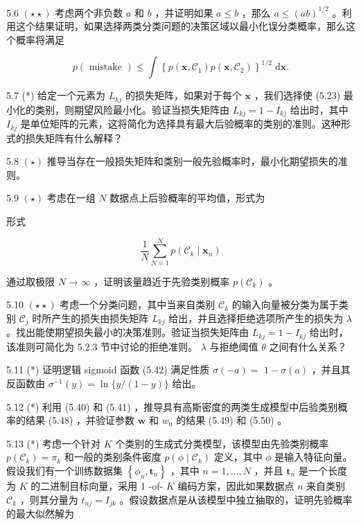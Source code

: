 \documentclass[10pt]{report}
\begin{document}
5.6 \(\left( {\star  \star  }\right)\) 考虑两个非负数 \(a\) 和 \(b\) ，并证明如果 \(a \leq  b\) ，那么 \(a \leq  {\left( ab\right) }^{1/2}\) 。利用这个结果证明，如果选择两类分类问题的决策区域以最小化误分类概率，那么这个概率将满足

\[
p\left( \text{ mistake }\right)  \leq  \int {\left\{  p\left( \mathbf{x},{\mathcal{C}}_{1}\right) p\left( \mathbf{x},{\mathcal{C}}_{2}\right) \right\}  }^{1/2}\mathrm{\;d}\mathbf{x}. \tag{5.99}
\]

5.7 (*) 给定一个元素为 \({L}_{kj}\) 的损失矩阵，如果对于每个 \(\mathbf{x}\) ，我们选择使 (5.23) 最小化的类别，则期望风险最小化。验证当损失矩阵由 \({L}_{kj} = 1 - {I}_{kj}\) 给出时，其中 \({I}_{kj}\) 是单位矩阵的元素，这将简化为选择具有最大后验概率的类别的准则。这种形式的损失矩阵有什么解释？

5.8 \(\left( \star \right)\) 推导当存在一般损失矩阵和类别一般先验概率时，最小化期望损失的准则。

5.9 \(\left( \star \right)\) 考虑在一组 \(N\) 数据点上后验概率的平均值，形式为

形式

\[
\frac{1}{N}\mathop{\sum }\limits_{{N = 1}}^{N}p\left( {{\mathcal{C}}_{k} \mid  {\mathbf{x}}_{n}}\right)  \tag{5.100}
\]

通过取极限 \(N \rightarrow  \infty\) ，证明该量趋近于先验类别概率 \(p\left( {\mathcal{C}}_{k}\right)\) 。

5.10 \(\left( {\star  \star  }\right)\) 考虑一个分类问题，其中当来自类别 \({\mathcal{C}}_{k}\) 的输入向量被分类为属于类别 \({\mathcal{C}}_{j}\) 时所产生的损失由损失矩阵 \({L}_{kj}\) 给出，并且选择拒绝选项所产生的损失为 \(\lambda\) 。找出能使期望损失最小的决策准则。验证当损失矩阵由 \({L}_{kj} = 1 - {I}_{kj}\) 给出时，该准则可简化为 5.2.3 节中讨论的拒绝准则。 \(\lambda\) 与拒绝阈值 \(\theta\) 之间有什么关系？

5.11 (*) 证明逻辑 sigmoid 函数 (5.42) 满足性质 \(\sigma \left( {-a}\right)  =\)  \(1 - \sigma \left( a\right)\) ，并且其反函数由 \({\sigma }^{-1}\left( y\right)  = \ln \{ y/\left( {1 - y}\right) \}\) 给出。

5.12 (*) 利用 (5.40) 和 (5.41) ，推导具有高斯密度的两类生成模型中后验类别概率的结果 (5.48) ，并验证参数 \(\mathbf{w}\) 和 \({w}_{0}\) 的结果 (5.49) 和 (5.50) 。

5.13 (*) 考虑一个针对 \(K\) 个类别的生成式分类模型，该模型由先验类别概率 \(p\left( {\mathcal{C}}_{k}\right)  = {\pi }_{k}\) 和一般的类别条件密度 \(p\left( {\phi  \mid  {\mathcal{C}}_{k}}\right)\) 定义，其中 \(\phi\) 是输入特征向量。假设我们有一个训练数据集 \(\left\{  {{\phi }_{n},{\mathbf{t}}_{n}}\right\}\) ，其中 \(n = 1,\ldots ,N\) ，并且 \({\mathbf{t}}_{n}\) 是一个长度为 \(K\) 的二进制目标向量，采用 1 -of- \(K\) 编码方案，因此如果数据点 \(n\) 来自类别 \({\mathcal{C}}_{k}\) ，则其分量为 \({t}_{nj} = {I}_{jk}\) 。假设数据点是从该模型中独立抽取的，证明先验概率的最大似然解为
\end{document}

